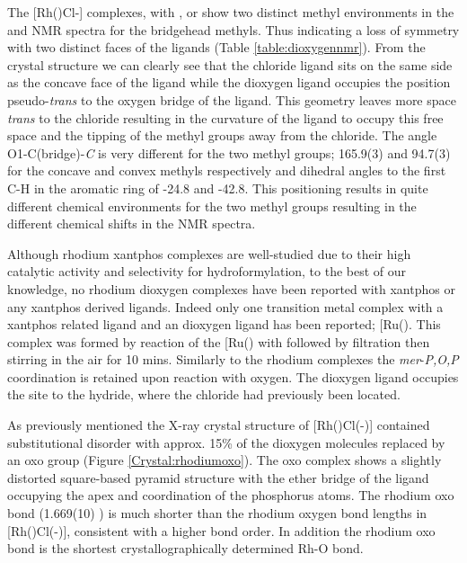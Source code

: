 The [Rh(\tBuxantphos)Cl\hapto{}-] complexes, with \tBusixantphos, or \tBuxantphos{} show two distinct methyl environments in the \proton{} and \carbon{} NMR spectra for the bridgehead methyls.  Thus indicating a loss of symmetry with two distinct faces of the \tBuxantphos{} ligands (Table \ref{table:dioxygennmr}).  From the crystal structure we can clearly see that the chloride ligand sits on the same side as the concave face of the ligand while the dioxygen ligand occupies the position pseudo-\emph{trans} to the oxygen bridge of the ligand.  This geometry leaves more space \emph{trans} to the chloride resulting in the curvature of the ligand to occupy this free space and the tipping of the methyl groups away from the chloride.  The angle O1-C(bridge)-\emph{C} is very different for the two methyl groups; 165.9(3) and 94.7(3) for the concave and convex methyls respectively and dihedral angles to the first C-H in the aromatic ring of -24.8 and -42.8\degrees.  This positioning results in quite different chemical environments for the two methyl groups resulting in the different chemical shifts in the NMR spectra.  

Although rhodium xantphos{} complexes are well-studied due to their high catalytic activity and selectivity for hydroformylation, to the best of our knowledge, no rhodium dioxygen complexes have been reported with xantphos or any xantphos derived ligands.  Indeed only one transition metal complex with a xantphos related ligand and an  dioxygen ligand has been reported; [Ru(\Phxantphos)\ce{(PPh3)(\hapto{2}-O2)H]BAr4^F}.\cite{Ledger2010}  This complex was formed by reaction of the [Ru(\Phxantphos)\ce{PPh3HCl]} with  followed by filtration then stirring in the air for 10 mins.  Similarly to the rhodium \tBuxantphos{} complexes the \emph{mer}-\dento{}\emph{P,O,P} coordination is retained upon reaction with oxygen.  The dioxygen ligand occupies the site \trans{} to the hydride, where the chloride had previously been located.  

As previously mentioned the X-ray crystal structure of [Rh(\tBuxantphos)Cl(-)] contained substitutional disorder with approx. 15\%{} of the dioxygen molecules replaced by an oxo group (Figure \ref{Crystal:rhodiumoxo}).  The oxo complex shows a slightly distorted square-based pyramid structure with the ether bridge of the \tBuxantphos{} ligand occupying the apex and \trans{} coordination of the phosphorus atoms.  The rhodium oxo bond (1.669(10) \A) is much shorter than the rhodium oxygen bond lengths in [Rh(\tBuxantphos)Cl(-)], consistent with a higher bond order.  In addition the rhodium oxo bond is the shortest crystallographically determined Rh-O bond.  

